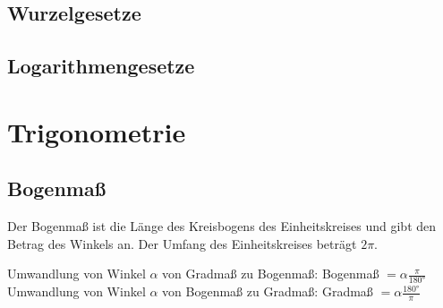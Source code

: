 \documentclass[12pt]{article}
\begin{document}
\subsection{Wurzelgesetze}
\begin{center}
\end{center}

\subsection{Logarithmengesetze}
\begin{center}
\end{center}

\newpage
\section{Trigonometrie}
\subsection{Bogenmaß}
Der Bogenmaß ist die Länge des Kreisbogens des Einheitskreises und gibt den Betrag des Winkels an. Der Umfang des Einheitskreises beträgt $2\pi$.
\begin{center}
\end{center}
Umwandlung von Winkel $\alpha$ von Gradmaß zu Bogenmaß: Bogenmaß $= \alpha \frac{\pi}{\text{180°}}$
Umwandlung von Winkel $\alpha$ von Bogenmaß zu Gradmaß: Gradmaß $= \alpha \frac{\text{180°}}{\pi}$
\end{document}
